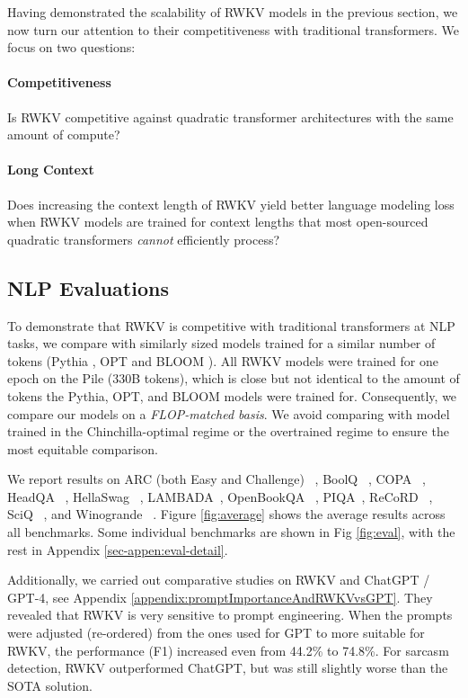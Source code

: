 Having demonstrated the scalability of RWKV models in the previous section, we now turn our attention to their competitiveness with traditional transformers. We focus on two questions:

\paragraph{Competitiveness} Is RWKV competitive against quadratic transformer architectures with the same amount of compute?

\paragraph{Long Context} Does increasing the context length of RWKV yield better language modeling loss when RWKV models are trained for context lengths that most open-sourced quadratic transformers \textit{cannot} efficiently process?

\subsection{NLP Evaluations}

To demonstrate that RWKV is competitive with traditional transformers at NLP tasks, we compare with similarly sized models trained for a similar number of tokens (Pythia \cite{biderman2023pythia}, OPT \cite{zhang2022opt} and BLOOM \cite{scao2022bloom}). All RWKV models were trained for one epoch on the Pile (330B tokens), which is close but not identical to the amount of tokens the Pythia, OPT, and BLOOM models were trained for. Consequently, we compare our models on a \textit{FLOP-matched basis}. We avoid comparing with model trained in the Chinchilla-optimal regime \citep{hoffmann2022training} or the overtrained regime \citep{touvron2023llama} to ensure the most equitable comparison.

We report results on ARC (both Easy and Challenge) ~\cite{ARC2018}, BoolQ ~\cite{clark2019boolq}, COPA ~\cite{COPA2011}, HeadQA ~\cite{HeadQA2020}, HellaSwag ~\cite{HellaSwag2019}, LAMBADA~\cite{LAMBADAdataset}, OpenBookQA ~\cite{OpenBookQA2018}, PIQA~\cite{Bisk2020}, ReCoRD ~\cite{ReCord}, SciQ ~\cite{SciQ2017}, and Winogrande ~\cite{Wino2020}. Figure \ref{fig:average} shows the average results across all benchmarks. Some individual benchmarks are shown in Fig \ref{fig:eval}, with the rest in Appendix \ref{sec-appen:eval-detail}.

Additionally, we carried out comparative studies on RWKV and ChatGPT / GPT-4, see Appendix \ref{appendix:promptImportanceAndRWKVvsGPT}. They revealed that RWKV is very sensitive to prompt engineering. When the prompts were adjusted (re-ordered) from the ones used for GPT to more suitable for RWKV, the performance (F1) increased even from 44.2\% to 74.8\%. For sarcasm detection, RWKV outperformed ChatGPT, but was still slightly worse than the SOTA solution.

